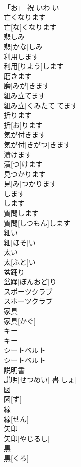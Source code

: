 \documentclass[8pt]{extreport}
\begin{document}
\begin{CJK}{UTF8}{min}
\\	「お」 祝[いわ]い	
\\	亡くなります	
\\	亡[な]くなります	
\\	悲しみ	
\\	悲[かな]しみ	
\\	利用します	
\\	利用[りよう]します	
\\	磨きます	
\\	磨[みが]きます	
\\	組み立てます	
\\	組み立[くみたて]てます	
\\	折ります	
\\	折[お]ります	
\\	気が付きます	
\\	気が付[きがつ]きます	
\\	漬けます	
\\	漬[つ]けます	
\\	見つかります	
\\	見[み]つかります	
\\	します
\\	します
\\	質問します	
\\	質問[しつもん]します	
\\	細い	
\\	細[ほそ]い	
\\	太い	
\\	太[ふと]い	
\\	盆踊り	
\\	盆踊[ぼんおど]り	
\\	スポーツクラブ	
\\	スポーツクラブ	
\\	家具	
\\	家具[かぐ]	
\\	キー	
\\	キー	
\\	シートベルト	
\\	シートベルト	
\\	説明書	
\\	説明[せつめい] 書[しょ]	
\\	図	
\\	図[ず]	
\\	線	
\\	線[せん]	
\\	矢印	
\\	矢印[やじるし]	
\\	黒	
\\	黒[くろ]	

\end{CJK}
\end{document}
